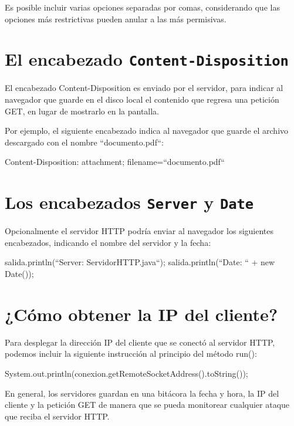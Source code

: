 \documentclass[11pt,a4paper,oneside]{book}
\begin{document}
Es posible incluir varias opciones separadas por comas, considerando que las opciones más restrictivas pueden anular a las más permisivas.

\section{El encabezado \texttt{Content-Disposition}}

El encabezado Content-Disposition es enviado por el servidor, para indicar al navegador que guarde en el disco local el contenido que regresa una petición GET, en lugar de mostrarlo en la pantalla.

Por ejemplo, el siguiente encabezado indica al navegador que guarde el archivo descargado con el nombre ``documento.pdf``:

\begin{SourceCode}
Content-Disposition: attachment; filename=``documento.pdf``
\end{SourceCode}

\section{Los encabezados \texttt{Server} y \texttt{Date}}

Opcionalmente el servidor HTTP podría enviar al navegador los siguientes encabezados, indicando el nombre del servidor y la fecha:

\begin{SourceCode}
salida.println(``Server: ServidorHTTP.java``);
salida.println(``Date: `` + new Date());
\end{SourceCode}

\section{¿Cómo obtener la IP del cliente?}

Para desplegar la dirección IP del cliente que se conectó al servidor HTTP, podemos incluir la siguiente instrucción al principio del método run():

\begin{SourceCode}
System.out.println(conexion.getRemoteSocketAddress().toString());
\end{SourceCode}

En general, los servidores guardan en una bitácora la fecha y hora, la IP del cliente y la petición GET de manera que se pueda monitorear cualquier ataque que reciba el servidor HTTP.
\end{document}
